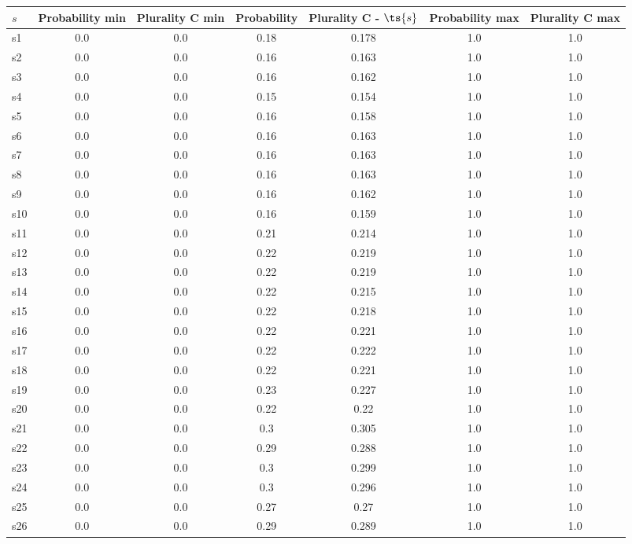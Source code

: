 \documentclass{article}
\begin{document}
\noindent\begin{tabular}{|l|c|c|c|c|c|c|}
\hline
$s$& Probability min & Plurality C min & Probability & Plurality C - $\ts{s}$ & Probability max & Plurality C max\\
\hline
s1 &0.0 & 0.0 & 0.18 & 0.178 & 1.0 & 1.0\\
\hline
s2 &0.0 & 0.0 & 0.16 & 0.163 & 1.0 & 1.0\\
\hline
s3 &0.0 & 0.0 & 0.16 & 0.162 & 1.0 & 1.0\\
\hline
s4 &0.0 & 0.0 & 0.15 & 0.154 & 1.0 & 1.0\\
\hline
s5 &0.0 & 0.0 & 0.16 & 0.158 & 1.0 & 1.0\\
\hline
s6 &0.0 & 0.0 & 0.16 & 0.163 & 1.0 & 1.0\\
\hline
s7 &0.0 & 0.0 & 0.16 & 0.163 & 1.0 & 1.0\\
\hline
s8 &0.0 & 0.0 & 0.16 & 0.163 & 1.0 & 1.0\\
\hline
s9 &0.0 & 0.0 & 0.16 & 0.162 & 1.0 & 1.0\\
\hline
s10 &0.0 & 0.0 & 0.16 & 0.159 & 1.0 & 1.0\\
\hline
s11 &0.0 & 0.0 & 0.21 & 0.214 & 1.0 & 1.0\\
\hline
s12 &0.0 & 0.0 & 0.22 & 0.219 & 1.0 & 1.0\\
\hline
s13 &0.0 & 0.0 & 0.22 & 0.219 & 1.0 & 1.0\\
\hline
s14 &0.0 & 0.0 & 0.22 & 0.215 & 1.0 & 1.0\\
\hline
s15 &0.0 & 0.0 & 0.22 & 0.218 & 1.0 & 1.0\\
\hline
s16 &0.0 & 0.0 & 0.22 & 0.221 & 1.0 & 1.0\\
\hline
s17 &0.0 & 0.0 & 0.22 & 0.222 & 1.0 & 1.0\\
\hline
s18 &0.0 & 0.0 & 0.22 & 0.221 & 1.0 & 1.0\\
\hline
s19 &0.0 & 0.0 & 0.23 & 0.227 & 1.0 & 1.0\\
\hline
s20 &0.0 & 0.0 & 0.22 & 0.22 & 1.0 & 1.0\\
\hline
s21 &0.0 & 0.0 & 0.3 & 0.305 & 1.0 & 1.0\\
\hline
s22 &0.0 & 0.0 & 0.29 & 0.288 & 1.0 & 1.0\\
\hline
s23 &0.0 & 0.0 & 0.3 & 0.299 & 1.0 & 1.0\\
\hline
s24 &0.0 & 0.0 & 0.3 & 0.296 & 1.0 & 1.0\\
\hline
s25 &0.0 & 0.0 & 0.27 & 0.27 & 1.0 & 1.0\\
\hline
s26 &0.0 & 0.0 & 0.29 & 0.289 & 1.0 & 1.0\\
\hline

\end{tabular}
\end{document}

